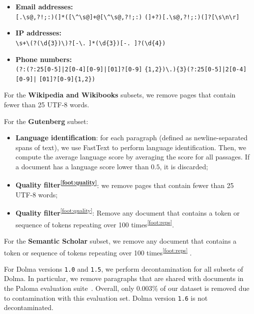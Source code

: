 \documentclass{article}
\newcommand{\dolma}{Dolma\xspace}
\newcommand*{\fnref}[1]{\textsuperscript{\ref{#1}}}
\begin{document}
\begin{itemize}
    \item \textbf{Email addresses:}\\
    \texttt{[.\textbackslash{}s@,?!;:)(]*([\textbackslash{}\textasciicircum{}\textbackslash{}s@]+@[\textbackslash{}\textasciicircum{}\textbackslash{}s@,?!;:)}
    \newline\texttt{(]+?)[.\textbackslash{}s@,?!;:)}\texttt{(]?[\textbackslash{}s\textbackslash{}n\textbackslash{}r]
}
    \item \textbf{IP addresses:} \\
    \texttt{\textbackslash{}s+\textbackslash{}(?(\textbackslash{}d\{3\})\textbackslash{})?[-\textbackslash{}.}
    \newline\texttt{]*(\textbackslash{}d\{3\})[-. ]?(\textbackslash{}d\{4\})}
    \item \textbf{Phone numbers:} \\
    \texttt{(?:(?:25[0-5]|2[0-4][0-9]|[01]?[0-9]}
    \newline\texttt{\{1,2\})\textbackslash.)\{3\}}\texttt{(?:25[0-5]|2[0-4][0-9]|}
    \newline\texttt{[01]?[0-9]\{1,2\})}
\end{itemize}

For the \textbf{Wikipedia and Wikibooks} subsets, we remove pages that contain fewer than 25 UTF-8 words. 

For the \textbf{Gutenberg} subset:
\begin{itemize}[leftmargin=1em]
    \item \textbf{Language identification}: for each paragraph (defined as newline-separated spans of text), we use FastText to perform language identification. 
    Then, we compute the average language score by averaging the score for all passages. 
    If a document has a language score lower than $0.5$, it is discarded;
    \item \textbf{Quality filter\fnref{foot:quality}}: we remove pages that contain fewer than 25 UTF-8 words;
    \item \textbf{Quality filter}\fnref{foot:quality}: Remove any document that contains a token or sequence of tokens repeating over 100 times\fnref{foot:reps}.
\end{itemize}

For the \textbf{Semantic Scholar} subset, we remove any document that contains a token or sequence of tokens repeating over 100 times\fnref{foot:reps} .

For \dolma versions \texttt{1.0} and \texttt{1.5}, we perform decontamination for all subsets of \dolma. In particular, we remove paragraphs that are shared with documents in the Paloma evaluation suite~\citep{paloma}.
Overall, only 0.003\% of our dataset is removed due to contamination with this evaluation set. 
\dolma version \texttt{1.6} is not decontaminated.
\end{document}
